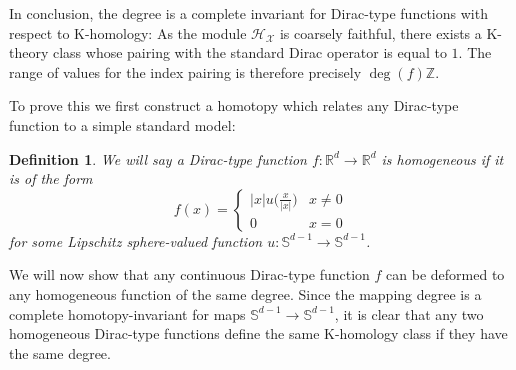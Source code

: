\documentclass[12pt]{amsart}
\newtheorem{definition}[theorem]{Definition}
\newcommand{\RM}{{\mathbb R}}
\newcommand{\SM}{{\mathbb S}}
\newcommand{\ZM}{{\mathbb Z}}
\newcommand{\Hh}{{\mathcal H}}
\newcommand{\Xx}{{\mathcal X}}
\providecommand{\abs}[1]{\left \lvert#1 \right \rvert}
\begin{document}
In conclusion, the degree is a complete invariant for Dirac-type functions with respect to K-homology: 
As the module $\Hh_\Xx$ is coarsely faithful, there exists a K-theory class whose pairing with the standard Dirac operator is equal to $1$. The range of values for the index pairing is therefore precisely $\deg(f)\ZM$. 

To prove this we first construct a homotopy which relates any Dirac-type function to a simple standard model:

\begin{definition}\label{definition:homogeneous_homotopy}
We will say a Dirac-type function $f: \RM^d \to \RM^d$ is homogeneous if it is of the form
$$ f(x) =
\begin{cases}
   \abs{x} u\bigl(\frac{x}{\abs{x}}\bigr) & x\neq 0\\
    0 & x=0
\end{cases}
$$
for some Lipschitz sphere-valued function $u: \SM^{d-1}\to \SM^{d-1}$.
\end{definition}

We will now show that any continuous Dirac-type function $f$ can be deformed to any homogeneous function of the same degree. Since the mapping degree is a complete homotopy-invariant for maps $\SM^{d-1}\to \SM^{d-1}$, it is clear that any two homogeneous Dirac-type functions define the same K-homology class if they have the same degree. 
\end{document}
